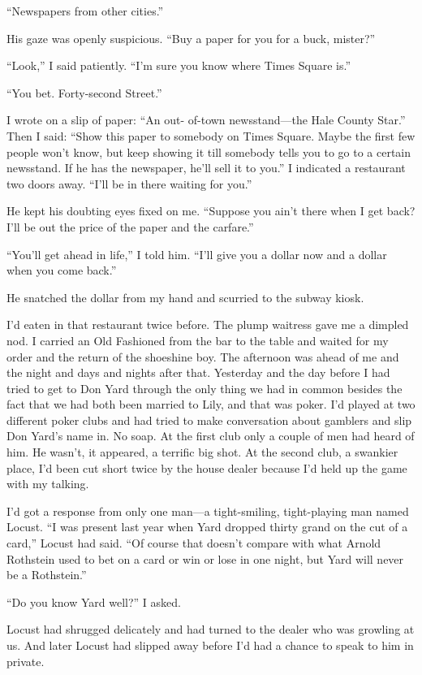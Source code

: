 \documentclass{novel}
\begin{document}
{“Newspapers from other cities.”

His gaze was openly suspicious. “Buy a paper for you for a buck, mister?”

“Look,” I said patiently. “I’m sure you know where Times Square is.”

“You bet. Forty-second Street.”

I wrote on a slip of paper: “An out- of-town newsstand—the Hale County Star.” Then I said: “Show this paper to somebody on Times Square. Maybe the first few people won’t know, but keep showing it till somebody tells you to go to a certain newsstand. If he has the newspaper, he’ll sell it to you.” I indicated a restaurant two doors away. “I’ll be in there waiting for you.”

He kept his doubting eyes fixed on me. “Suppose you ain’t there when I get back? I’ll be out the price of the paper and the carfare.”

“You’ll get ahead in life,” I told him. “I’ll give you a dollar now and a dollar when you come back.”

He snatched the dollar from my hand and scurried to the subway kiosk.

I’d eaten in that restaurant twice before. The plump waitress gave me a dimpled nod. I carried an Old Fashioned from the bar to the table and waited for my order and the return of the shoeshine boy. The afternoon was ahead of me and the night and days and nights after that. Yesterday and the day before I had tried to get to Don Yard through the only thing we had in common besides the fact that we had both been married to Lily, and that was poker. I’d played at two different poker clubs and had tried to make conversation about gamblers and slip Don Yard’s name in. No soap. At the first club only a couple of men had heard of him. He wasn’t, it appeared, a terrific big shot. At the second club, a swankier place, I’d been cut short twice by the house dealer because I’d held up the game with my talking.

I’d got a response from only one man—a tight-smiling, tight-playing man named Locust. “I was present last year when Yard dropped thirty grand on the cut of a card,” Locust had said. “Of course that doesn’t compare with what Arnold Rothstein used to bet on a card or win or lose in one night, but Yard will never be a Rothstein.”

“Do you know Yard well?” I asked.

Locust had shrugged delicately and had turned to the dealer who was growling at us. And later Locust had slipped away before I’d had a chance to speak to him in private.

}
\end{document}
